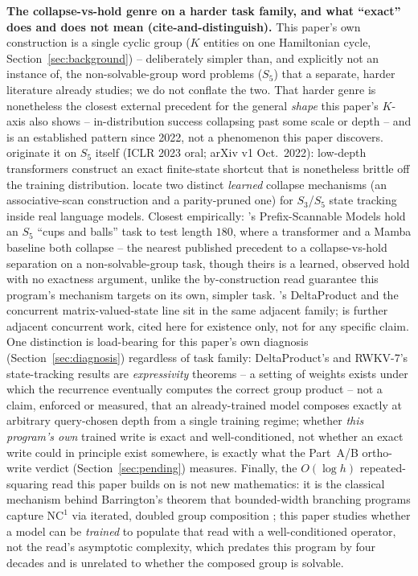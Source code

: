 \textbf{The collapse-vs-hold genre on a harder task family, and what
``exact'' does and does not mean (cite-and-distinguish).} This paper's
own construction is a single cyclic group ($K$ entities on one
Hamiltonian cycle, Section~\ref{sec:background}) -- deliberately simpler
than, and explicitly not an instance of, the non-solvable-group word
problems ($S_5$) that a separate, harder literature already studies; we
do not conflate the two. That harder genre is nonetheless the closest
external precedent for the general \emph{shape} this paper's $K$-axis
also shows -- in-distribution success collapsing past some scale or
depth -- and is an established pattern since 2022, not a phenomenon this
paper discovers. \citet{liu2023shortcuts} originate it on $S_5$ itself
(ICLR 2023 oral; arXiv v1 Oct.\ 2022): low-depth transformers construct
an exact finite-state shortcut that is nonetheless brittle off the
training distribution. \citet{li2025track} locate two distinct
\emph{learned} collapse mechanisms (an associative-scan construction and
a parity-pruned one) for $S_3$/$S_5$ state tracking inside real language
models. Closest empirically: \citet{yau2026sequential}'s Prefix-Scannable
Models hold an $S_5$ ``cups and balls'' task to test length $180$, where
a transformer and a Mamba baseline both collapse -- the nearest published
precedent to a collapse-vs-hold separation on a non-solvable-group task,
though theirs is a learned, observed hold with no exactness argument,
unlike the by-construction read guarantee this program's mechanism
targets on its own, simpler task. \citet{siems2025deltaproduct}'s
DeltaProduct and the concurrent matrix-valued-state line
\citet{mishra2026m2rnn} sit in the same adjacent family; \citet{lee2026falsifier}
is further adjacent concurrent work, cited here for existence only, not
for any specific claim. One distinction is
load-bearing for this paper's own diagnosis
(Section~\ref{sec:diagnosis}) regardless of task family: DeltaProduct's
and RWKV-7's state-tracking results \citep{siems2025deltaproduct,
peng2025rwkv7} are \emph{expressivity} theorems -- a setting of weights
exists under which the recurrence eventually computes the correct group
product -- not a claim, enforced or measured, that an already-trained
model composes exactly at arbitrary query-chosen depth from a single
training regime; whether \emph{this program's own} trained write is
exact and well-conditioned, not whether an exact write could in
principle exist somewhere, is exactly what the Part~A/B ortho-write
verdict (Section~\ref{sec:pending}) measures. Finally, the $O(\log h)$
repeated-squaring read this paper builds on is not new mathematics: it
is the classical mechanism behind Barrington's theorem that bounded-width
branching programs capture $\mathrm{NC}^1$ via iterated, doubled group
composition \citep{barrington1989}; this paper studies whether a model
can be \emph{trained} to populate that read with a well-conditioned
operator, not the read's asymptotic complexity, which predates this
program by four decades and is unrelated to whether the composed group is
solvable.

